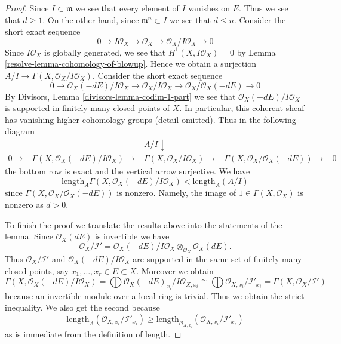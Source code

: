 \begin{proof}

Since $I \subset \mathfrak m$ we see that every element of $I$
vanishes on $E$. Thus we see that $d \geq 1$. On the other hand, since
$\mathfrak m^n \subset I$ we see that $d \leq n$. Consider the
short exact sequence
$$
0 \to I\mathcal{O}_X \to \mathcal{O}_X \to \mathcal{O}_X/I\mathcal{O}_X \to 0
$$
Since $I\mathcal{O}_X$ is globally generated, we see that
$H^1(X, I\mathcal{O}_X) = 0$ by Lemma \ref{resolve-lemma-cohomology-of-blowup}.
Hence we obtain a surjection
$A/I \to \Gamma(X, \mathcal{O}_X/I\mathcal{O}_X)$. Consider the short exact
sequence
$$
0 \to
\mathcal{O}_X(-dE)/I\mathcal{O}_X \to
\mathcal{O}_X/I\mathcal{O}_X \to
\mathcal{O}_X/\mathcal{O}_X(-dE) \to 0
$$
By Divisors, Lemma \ref{divisors-lemma-codim-1-part}
we see that $\mathcal{O}_X(-dE)/I\mathcal{O}_X$ is supported in finitely many
closed points of $X$. In particular, this coherent sheaf has vanishing higher
cohomology groups (detail omitted). Thus in the following diagram
$$
\begin{array}{ccccc} &  & A/I \downarrow &  &  \\ 0 \longrightarrow & \Gamma(X, \mathcal{O}_X(-dE)/I\mathcal{O}_X) \longrightarrow & \Gamma(X, \mathcal{O}_X/I\mathcal{O}_X) \longrightarrow & \Gamma(X, \mathcal{O}_X/\mathcal{O}_X(-dE)) \longrightarrow & 0\end{array}
$$
the bottom row is exact and the vertical arrow surjective. We have
$$
\text{length}_A \Gamma(X, \mathcal{O}_X(-dE)/I\mathcal{O}_X) <
\text{length}_A(A/I)
$$
since $\Gamma(X, \mathcal{O}_X/\mathcal{O}_X(-dE))$ is nonzero.
Namely, the image of $1 \in \Gamma(X, \mathcal{O}_X)$
is nonzero as $d > 0$.

\medskip\noindent
To finish the proof we translate the results above into the statements
of the lemma. Since
$\mathcal{O}_X(dE)$ is invertible we have
$$
\mathcal{O}_X/\mathcal{I}' =
\mathcal{O}_X(-dE)/I\mathcal{O}_X \otimes_{\mathcal{O}_X} \mathcal{O}_X(dE).
$$
Thus $\mathcal{O}_X/\mathcal{I}'$ and $\mathcal{O}_X(-dE)/I\mathcal{O}_X$
are supported in the same set of finitely many
closed points, say $x_1, \ldots, x_r \in E \subset X$.
Moreover we obtain
$$
\Gamma(X, \mathcal{O}_X(-dE)/I\mathcal{O}_X) =
\bigoplus \mathcal{O}_X(-dE)_{x_i}/I\mathcal{O}_{X, x_i}
\cong
\bigoplus \mathcal{O}_{X, x_i}/\mathcal{I}'_{x_i} =
\Gamma(X, \mathcal{O}_X/\mathcal{I}')
$$
because an invertible module over a local ring is trivial.
Thus we obtain the strict inequality. We also get the second because
$$
\text{length}_A(\mathcal{O}_{X, x_i}/\mathcal{I}'_{x_i}) \geq
\text{length}_{\mathcal{O}_{X, x_i}}(\mathcal{O}_{X, x_i}/\mathcal{I}'_{x_i})
$$
as is immediate from the definition of length.
\end{proof}

